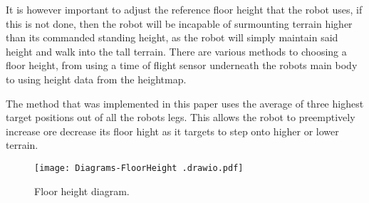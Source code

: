     It is however important to adjust the reference floor height that the robot uses, if this is not done, then the robot will be
    incapable of surmounting terrain higher than its commanded standing height, as the robot will simply maintain said height and walk into the tall terrain.
    There are various methods to choosing a floor height, from using 
    a time of flight sensor underneath the robots main body to using height data from the heightmap.

    The method that was implemented in this paper uses the average of three highest target positions out of all the robots legs.
    This allows the robot to preemptively increase ore decrease its floor hight as it targets to step onto higher or lower terrain.

    \begin{figure}[h]
        \centering
        \texttt{[image: Diagrams-FloorHeight .drawio.pdf]}
        \caption{Floor height diagram.}
        \label{fig:floor_height}
    \end{figure}